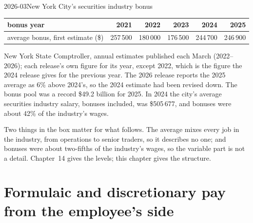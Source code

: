 \begin{dated}{2026-03}{New York City's securities industry bonus}\label{dat:in:how-pay-works:nyc}
\footnotesize
\begin{tabular}{@{}lrrrrr@{}}
\toprule
bonus year & 2021 & 2022 & 2023 & 2024 & 2025\\
\midrule
average bonus, first estimate (\$) & 257\,500 & 180\,000 & 176\,500 & 244\,700 & 246\,900\\
\bottomrule
\end{tabular}

\smallskip\noindent New York State Comptroller, annual estimates published each March (2022--2026); each release's own
figure for its year, except 2022, which is the figure the 2024 release gives for the previous year. The 2026 release
reports the 2025 average as 6\% above 2024's, so the 2024 estimate had been revised down. The bonus pool was a record
\$49.2 billion for 2025. In 2024 the city's average securities industry salary, bonuses included, was \$505\,677, and
bonuses were about 42\% of the industry's wages.
\end{dated}

Two things in the box matter for what follows. The average mixes every job in the industry, from operations to senior
traders, so it describes no one; and bonuses were about two-fifths of the industry's wages, so the variable part is not
a detail. Chapter~14 gives the levels; this chapter gives the structure.

\section{Formulaic and discretionary pay from the employee's side}


